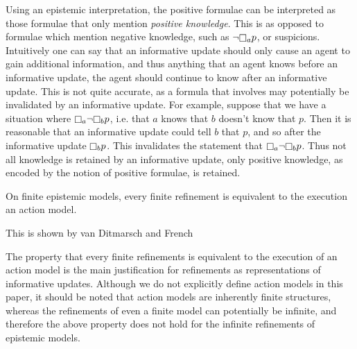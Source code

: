Using an epistemic interpretation, the positive formulae can be interpreted as
those formulae that only mention {\em positive knowledge}. This is as opposed to
formulae which mention negative knowledge, such as $\neg \knows_a p$, or
suspicions. Intuitively one can say that an informative update should only cause
an agent to gain additional information, and thus anything that an agent knows
before an informative update, the agent should continue to know after an
informative update. This is not quite accurate, as a formula that involves may
potentially be invalidated by an informative update. For example, suppose that
we have a situation where $\knows_a \neg \knows_b p$, i.e. that $a$ knows that
$b$ doesn't know that $p$. Then it is reasonable that an informative update
could tell $b$ that $p$, and so after the informative update $\knows_b p$. This
invalidates the statement that $\knows_a \neg \knows_b p$. Thus not all
knowledge is retained by an informative update, only positive knowledge, as
encoded by the notion of positive formulae, is retained.

\begin{proposition}
On finite epistemic models, every finite refinement is equivalent to the
execution an action model.
\end{proposition}

This is shown by van Ditmarsch and French~\cite{french2009simulation}

The property that every finite refinements is equivalent to the execution of an
action model is the main justification for refinements as representations of
informative updates. Although we do not explicitly define action models in this
paper, it should be noted that action models are inherently finite structures,
whereas the refinements of even a finite model can potentially be infinite, and
therefore the above property does not hold for the infinite refinements of
epistemic models.

